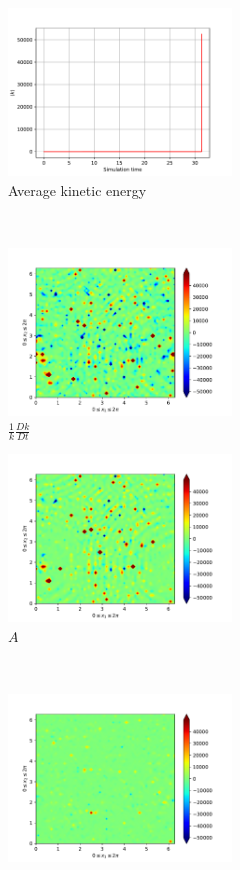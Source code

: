\begin{figure}[H]
    \begin{subfigure}[H]{0.45\textwidth}
        \includegraphics[height=1.75in]{media/run-cds-65-25k/ke-average2449}
        \caption{Average kinetic energy}
    \end{subfigure}
    ~
    \begin{subfigure}[H]{0.45\textwidth}
        \includegraphics[height=1.75in]{media/run-cds-65-25k/ke-2449}
        \caption{$\frac{1}{k} \frac{D k}{Dt}$}
    \end{subfigure}
    \newline
    \begin{subfigure}{0.45\textwidth}
        \includegraphics[height=1.75in]{media/run-cds-65-25k/A-ke-449}
        \caption{$A$}
    \end{subfigure}
    ~
    \begin{subfigure}{0.45\textwidth}
        \includegraphics[height=1.75in]{media/run-cds-65-25k/C-ke-449}

\end{subfigure}
\end{figure}
